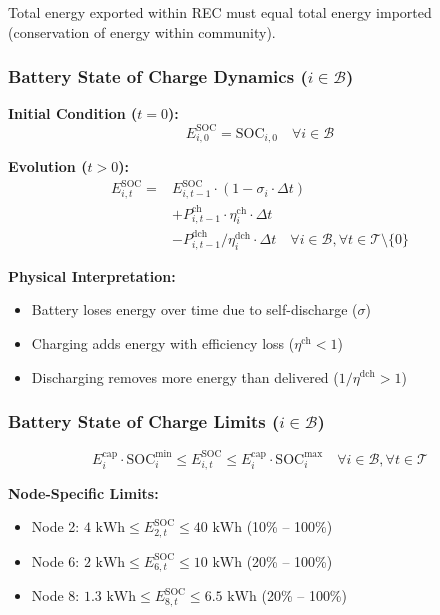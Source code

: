 \documentclass[11pt,a4paper]{article}
\begin{document}
Total energy exported within REC must equal total energy imported (conservation of energy within community).

\subsubsection{Battery State of Charge Dynamics ($i \in \mathcal{B}$)}

\textbf{Initial Condition ($t = 0$):}
\begin{equation}
E_{i,0}^{\text{SOC}} = \text{SOC}_{i,0} \quad \forall i \in \mathcal{B}
\end{equation}

\textbf{Evolution ($t > 0$):}
\begin{equation}
\begin{split}
E_{i,t}^{\text{SOC}} = &E_{i,t-1}^{\text{SOC}} \cdot (1 - \sigma_i \cdot \Delta t) \\
                       &+ P_{i,t-1}^{\text{ch}} \cdot \eta_i^{\text{ch}} \cdot \Delta t \\
                       &- P_{i,t-1}^{\text{dch}} / \eta_i^{\text{dch}} \cdot \Delta t 
\quad \forall i \in \mathcal{B}, \forall t \in \mathcal{T} \setminus \{0\}
\end{split}
\end{equation}

\textbf{Physical Interpretation:}
\begin{itemize}
    \item Battery loses energy over time due to self-discharge ($\sigma$)
    \item Charging adds energy with efficiency loss ($\eta^{\text{ch}} < 1$)
    \item Discharging removes more energy than delivered ($1/\eta^{\text{dch}} > 1$)
\end{itemize}

\subsubsection{Battery State of Charge Limits ($i \in \mathcal{B}$)}

\begin{equation}
E_i^{\text{cap}} \cdot \text{SOC}_i^{\min} \leq E_{i,t}^{\text{SOC}} \leq E_i^{\text{cap}} \cdot \text{SOC}_i^{\max} \quad \forall i \in \mathcal{B}, \forall t \in \mathcal{T}
\end{equation}

\textbf{Node-Specific Limits:}
\begin{itemize}
    \item Node 2: $4 \text{ kWh} \leq E_{2,t}^{\text{SOC}} \leq 40 \text{ kWh}$ (10\% -- 100\%)
    \item Node 6: $2 \text{ kWh} \leq E_{6,t}^{\text{SOC}} \leq 10 \text{ kWh}$ (20\% -- 100\%)
    \item Node 8: $1.3 \text{ kWh} \leq E_{8,t}^{\text{SOC}} \leq 6.5 \text{ kWh}$ (20\% -- 100\%)
\end{itemize}
\end{document}

